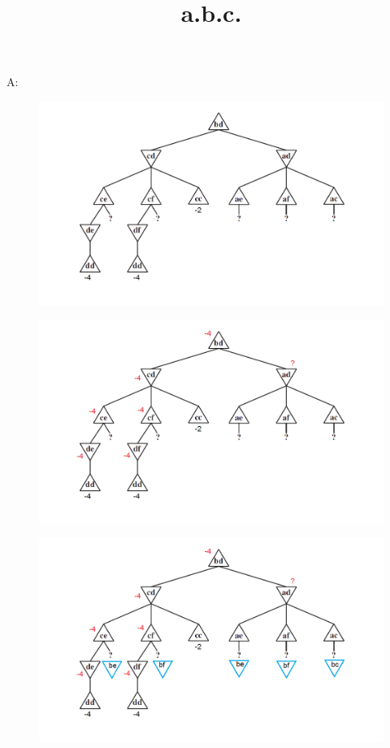 \documentclass{article}
\begin{document}
\begin{itemize}
\hspace*{-1em}A:\\
\begin{figure}[h!]
\centering
\includegraphics[width=\textwidth]{fig5_16(a).png}
\title{a.}
\end{figure}
\begin{figure}[h!]
\centering
\includegraphics[width=\textwidth]{fig5_16(b).png}
\title{b.}
\end{figure}
\begin{figure}[h!]
\centering
\includegraphics[width=\textwidth]{fig5_16(c).png}
\title{c.}
\end{figure}
\end{itemize}
\end{document}
